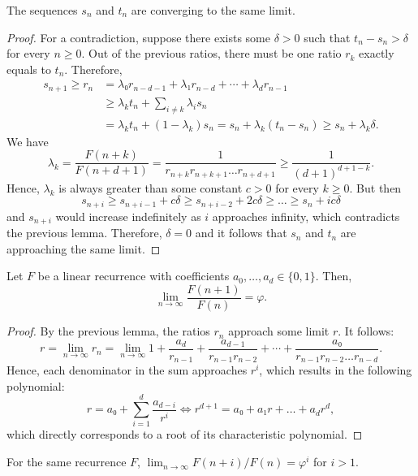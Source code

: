\begin{lemma}
  The sequences $s_n$ and $t_n$ are converging to the same limit.
\end{lemma}

\begin{proof}
  For a contradiction, suppose there exists some $δ > 0$ such that $t_n - s_n > δ$ for every $n ≥ 0$.
  Out of the previous ratios, there must be one ratio $r_k$ exactly equals to $t_n$.
  Therefore,
  \begin{align*}
    s_{n+1} ≥ r_n & = λ₀ r_{n-d-1} + λ₁ r_{n-d} + ⋯ + λ_d r_{n-1} \\
                  & ≥ λ_k t_n + \sum_{i ≠ k} λ_i s_n \\
                  & = λ_k t_n + (1 - λ_k) s_n = s_n + λ_k (t_n - s_n) ≥ s_n + λ_k δ.
  \end{align*}
  We have
  \[
    λ_k = \frac{F(n+k)}{F(n+d+1)} = \frac{1}{r_{n+k} r_{n+k+1} \dots r_{n+d+1}} ≥ \frac{1}{(d+1)^{d+1-k}}.
  \]
  Hence, $λ_k$ is always greater than some constant $c > 0$ for every $k ≥ 0$.
  But then
  \[
    s_{n+i} ≥ s_{n+i-1} + c δ ≥ s_{n+i-2} + 2c δ ≥ \dots ≥ s_n + i c δ
  \]
  and $s_{n+i}$ would increase indefinitely as $i$ approaches infinity,
  which contradicts the previous lemma.
  Therefore, $δ = 0$ and it follows that $s_n$ and $t_n$ are approaching the same limit.
\end{proof}

\begin{theorem}
  Let $F$ be a linear recurrence with coefficients $a_0, \dots, a_d ∈ \{0,1\}$.
  Then,
  \[
    \lim_{n \to \infty} \frac{F(n + 1)}{F(n)} = φ.
  \]
\end{theorem}

\begin{proof}
  By the previous lemma, the ratios $r_n$ approach some limit $r$. It follows:
  \[
    r
    = \lim_{n → ∞} r_n
    = \lim_{n → ∞} 1 + \frac{a_d}{r_{n-1}} + \frac{a_{d-1}}{r_{n-1} r_{n-2}} + ⋯ + \frac{a₀}{r_{n-1} r_{n-2} \dots r_{n-d}}.
  \]
  Hence, each denominator in the sum approaches $r^i$,
  which results in the following polynomial:
  \[
    r = a₀ + \sum_{i = 1}^d \frac{a_{d - i}}{r^i}
    \iff
    r^{d+1} = a₀ + a₁ r + \dots + a_d r^d,
  \]
  which directly corresponds to a root of its characteristic polynomial.
\end{proof}

\begin{corollary}
  For the same recurrence $F$, $\lim_{n → ∞} F(n + i) / F(n) = φ^i$ for $i > 1$.
\end{corollary}

